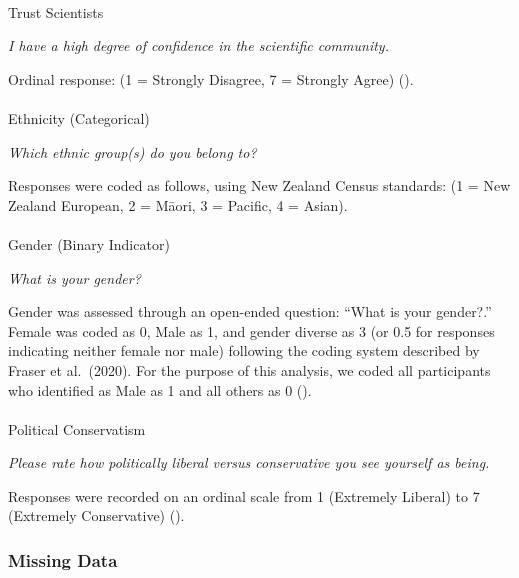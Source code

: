 \documentclass[
  single column]{article}
\makeatletter
\let\oldparagraph\paragraph
\renewcommand{\paragraph}{
    \@ifstar
      \xxxParagraphStar
      \xxxParagraphNoStar
  }
\newcommand{\xxxParagraphStar}[1]{\oldparagraph*{#1}\mbox{}}
\newcommand{\xxxParagraphNoStar}[1]{\oldparagraph{#1}\mbox{}}
\makeatother
\begin{document}
\paragraph{Trust Scientists}\label{trust-scientists-1}

\emph{I have a high degree of confidence in the scientific community.}

Ordinal response: (1 = Strongly Disagree, 7 = Strongly Agree)
().

\paragraph{Ethnicity (Categorical)}\label{ethnicity-categorical}

\emph{Which ethnic group(s) do you belong to?}

Responses were coded as follows, using New Zealand Census standards: (1
= New Zealand European, 2 = Māori, 3 = Pacific, 4 = Asian).

\paragraph{Gender (Binary Indicator)}\label{gender-binary-indicator}

\emph{What is your gender?}

Gender was assessed through an open-ended question: ``What is your
gender?.'' Female was coded as 0, Male as 1, and gender diverse as 3 (or
0.5 for responses indicating neither female nor male) following the
coding system described by Fraser et al.~(2020). For the purpose of this
analysis, we coded all participants who identified as Male as 1 and all
others as 0 ().

\paragraph{Political Conservatism}\label{political-conservatism}

\emph{Please rate how politically liberal versus conservative you see
yourself as being.}

Responses were recorded on an ordinal scale from 1 (Extremely Liberal)
to 7 (Extremely Conservative) ().

\subsubsection{Missing Data}\label{missing-data}
\end{document}
